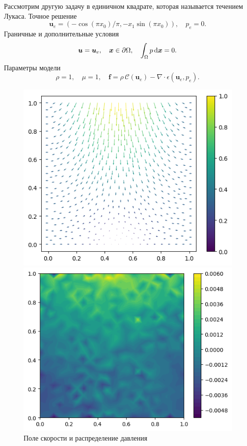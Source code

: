 \documentclass[a4paper,10pt]{report}
\begin{document}
Рассмотрим другую задачу в единичном квадрате, которая называется течением Лукаса. Точное решение 
\[
    \bm{u}_e = (-\cos(\pi x_0)/\pi, -x_1 \sin(\pi x_0)), \quad
    p_e = 0.
\]
Граничные и дополнительные условия
\[
    \bm{u} = \bm{u}_e, \quad \bm{x} \in \partial \Omega, \quad \int_\Omega p \,{\rm d}\bm{x} = 0.
\]
Параметры модели 
\[
    \rho=1, \quad \mu = 1, \quad \bm{f}=\rho \,\mathcal{C}(\bm{u}_e) - \nabla \cdot \epsilon(\bm{u}_e, p_e).
\]

\begin{figure}[H]
    \begin{minipage}{0.49\linewidth}
        \includegraphics[height=0.75\linewidth]{lucasflow/u.png}
    \end{minipage}
    \begin{minipage}{0.49\linewidth}
        \includegraphics[height=0.75\linewidth]{lucasflow/p.png}
    \end{minipage}
    \label{fig:lucasflow}
    \caption{Поле скорости и распределение давления}
\end{figure}
    
\end{document}
